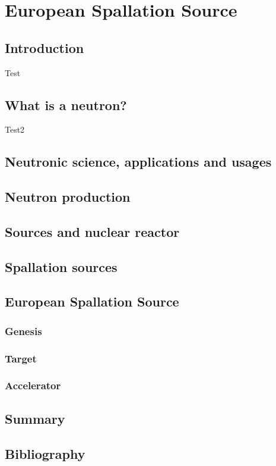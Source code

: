 \chapter{European Spallation Source}
\cleardoublepage

\minitoc

\section{Introduction}
\begin{refsection}
	\label{ch1:Introduction}
	Test \cite{Mason2005}

	\section{What is a neutron?}
	\label{ch1:s:Neutron}
	Test2 \cite{osti_656719}

	\section{Neutronic science, applications and usages}

	\section{Neutron production}

	\section{Sources and nuclear reactor}

	\section{Spallation sources}

	\section{European Spallation Source}

	\subsection{Genesis}

	\subsection{Target}

	\subsection{Accelerator}

	\section{Summary}
	\label{ch1:Summary}

	\cleardoublepage
	\section{Bibliography}
	\label{ch1:bib}
	\printbibliography[heading=subbibliography]
\end{refsection}